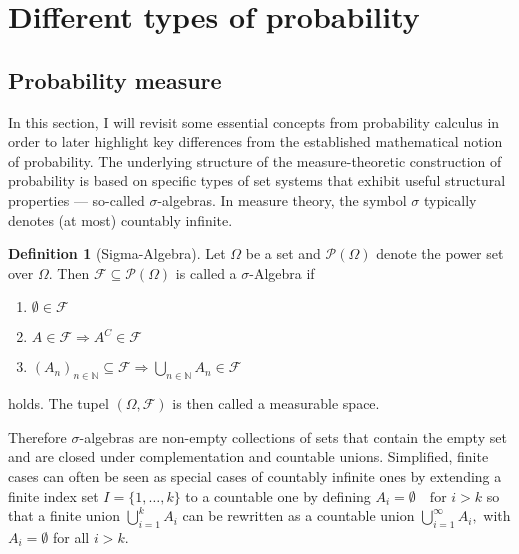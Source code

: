 \documentclass[
]{report}
\theoremstyle{definition}
\newtheorem{definition}{Definition}[section]
\begin{document}
\section{Different types of probability}

\subsection{Probability measure}

In this section, I will revisit some essential concepts from probability
calculus in order to later highlight key differences from the
established mathematical notion of probability. The underlying structure
of the measure-theoretic construction of probability is based on
specific types of set systems that exhibit useful structural properties
--- so-called \(\sigma\)-algebras. In measure theory, the symbol
\(\sigma\) typically denotes (at most) countably infinite.

\begin{definition}[Sigma-Algebra]
Let $\Omega$ be a set and $\mathcal{P}(\Omega)$ denote the power set over $\Omega$. Then $\mathcal{F} \subseteq \mathcal{P}(\Omega)$ is called a $\sigma$-Algebra if 
\begin{enumerate}
  \item $\emptyset \in  \mathcal{F}$
  \item $A \in \mathcal{F} \Rightarrow A^C \in \mathcal{F}$
  \item $(A_n)_{n \in \mathbb{N}} \subseteq \mathcal{F} \Rightarrow \displaystyle\bigcup_{n \in \mathbb{N}} A_n \in \mathcal{F}$
\end{enumerate}
holds. The tupel $(\Omega, \mathcal{F})$ is then called a {measurable space}.
\end{definition}

Therefore \(\sigma\)-algebras are non-empty collections of sets that
contain the empty set and are closed under complementation and countable
unions. Simplified, finite cases can often be seen as special cases of
countably infinite ones by extending a finite index set
\(I = \{1, \dots, k \}\) to a countable one by defining
\(A_i = \emptyset \quad \text{for } i > k\) so that a finite union
\(\bigcup_{i=1}^{k} A_i\) can be rewritten as a countable union
\(\bigcup_{i=1}^{\infty} A_i,\) with \(A_i = \emptyset\) for all
\(i > k\).
\end{document}
